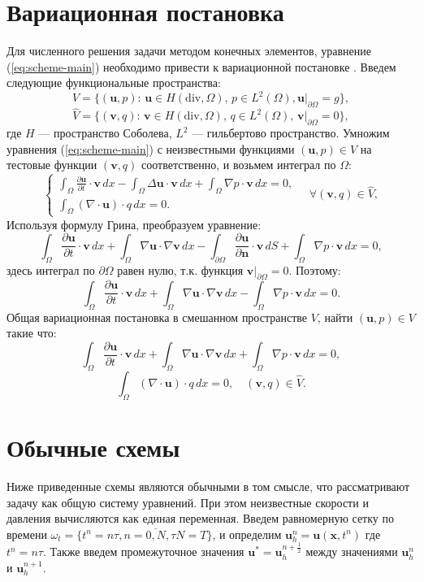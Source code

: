 \documentclass[12pt]{article}
\begin{document}
\section{Вариационная постановка}
Для численного решения задачи методом конечных элементов, уравнение (\ref{eq:scheme-main}) необходимо привести к вариационной постановке \cite{fenicsbook-2012}. Введем следующие функциональные пространства:
$$
V=\{ ({\bm u}, p) : \, {\bm u} \in H(\mathrm{div}, \Omega), \, p \in L^2(\Omega),  {\bm u}|_{\partial \Omega}=g \},
$$
$$
\hat V=\{ ({\bm v}, q) : \, {\bm v} \in H(\mathrm{div}, \Omega), \, q \in L^2(\Omega), \, {\bm v}|_{\partial \Omega}=0 \},
$$
где $H$ --- пространство Соболева, $L^2$ --- гильбертово пространство.
Умножим уравнения (\ref{eq:scheme-main}) с неизвестными функциями $({\bm u}, p) \in V$  на тестовые функции $({\bm v}, q)$ соответственно, и возьмем интеграл по $\Omega$:
$$
\left\{
\begin{aligned}
\int_{\Omega} \frac{\partial {\bm u}}{\partial t} \cdot {\bm v} \,dx - \int_{\Omega} \Delta {\bm u} \cdot {\bm v} \,dx + \int_{\Omega} \nabla p \cdot {\bm v} \,dx = 0, \\
\int_{\Omega} (\nabla \cdot {\bm u}) \cdot q \,dx = 0.
\end{aligned}
\right.
\quad \forall ({\bm v},q) \in \hat V,
$$
Используя формулу Грина, преобразуем уравнение:
$$
\int_{\Omega} \frac{\partial {\bm u}}{\partial t} \cdot {\bm v} \,dx + \int_{\Omega} \nabla {\bm u} \cdot \nabla {\bm v} \,dx - \int_{\partial \Omega} \frac{\partial {\bm u}}{\partial {\bm n}} \cdot {\bm v} \,dS + \int_{\Omega} \nabla p \cdot {\bm v} \,dx = 0,
$$
здесь интеграл по $\partial \Omega$ равен нулю, т.к. функция ${\bm v} | _ {\partial \Omega} = 0$. Поэтому:
$$
\int_{\Omega} \frac{\partial {\bm u}}{\partial t} \cdot {\bm v} \,dx + \int_{\Omega} \nabla {\bm u} \cdot \nabla {\bm v} \,dx - \int_{\Omega} \nabla p \cdot {\bm v} \,dx = 0.
$$
Общая вариационная постановка в смешанном пространстве $V$, найти $({\bm u}, p) \in V$ такие что:
$$
\int_{\Omega} \frac{\partial {\bm u}}{\partial t} \cdot {\bm v} \,dx + \int_{\Omega} \nabla {\bm u} \cdot \nabla {\bm v} \,dx + \int_{\Omega} \nabla p \cdot {\bm v} \,dx = 0, 
$$
$$
\int_{\Omega} (\nabla \cdot {\bm u}) \cdot q \,dx = 0, \quad ({\bm v}, q) \in \hat V.
$$

\section{Обычные схемы}
Ниже приведенные схемы являются обычными в том смысле, что рассматривают задачу как общую систему уравнений. При этом неизвестные скорости и давления вычисляются как единая переменная. Введем равномерную сетку по времени $\omega_t=\{t^n=n\tau, n=\overline{0,N}, \tau N = T \}$, и определим ${\bm u}_h^n={\bm u}({\bm x}, t^n)$ где $t^n=n\tau$. Также введем промежуточное значения ${\bm u}^*={\bm u}_h^{n+\frac{1}{2}}$ между значениями ${\bm u}_h^n$ и ${\bm u}_h^{n+1}$.
\end{document}
